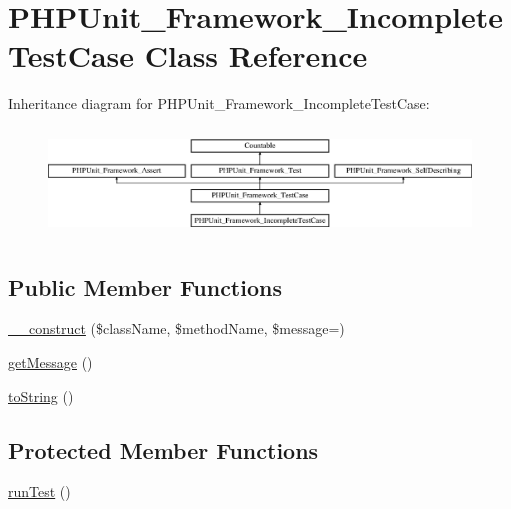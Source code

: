 \hypertarget{class_p_h_p_unit___framework___incomplete_test_case}{}\section{P\+H\+P\+Unit\+\_\+\+Framework\+\_\+\+Incomplete\+Test\+Case Class Reference}
\label{class_p_h_p_unit___framework___incomplete_test_case}
Inheritance diagram for P\+H\+P\+Unit\+\_\+\+Framework\+\_\+\+Incomplete\+Test\+Case\+:\begin{figure}[H]
\begin{center}
\leavevmode
\includegraphics[height=2.928105cm]{class_p_h_p_unit___framework___incomplete_test_case}
\end{center}
\end{figure}
\subsection*{Public Member Functions}
\begin{DoxyCompactItemize}
\item 
\mbox{\hyperlink{class_p_h_p_unit___framework___incomplete_test_case_afe6b924c0b9ead28b232f6860fc50236}{\+\_\+\+\_\+construct}} (\$class\+Name, \$method\+Name, \$message=\textquotesingle{}\textquotesingle{})
\item 
\mbox{\hyperlink{class_p_h_p_unit___framework___incomplete_test_case_a0b0e611236742aac18ba1936d03ba89a}{get\+Message}} ()
\item 
\mbox{\hyperlink{class_p_h_p_unit___framework___incomplete_test_case_a5558c5d549f41597377fa1ea8a1cefa3}{to\+String}} ()
\end{DoxyCompactItemize}
\subsection*{Protected Member Functions}
\begin{DoxyCompactItemize}
\item 
\mbox{\hyperlink{class_p_h_p_unit___framework___incomplete_test_case_ad2541a093be4d619db04ed65d661a684}{run\+Test}} ()
\end{DoxyCompactItemize}
